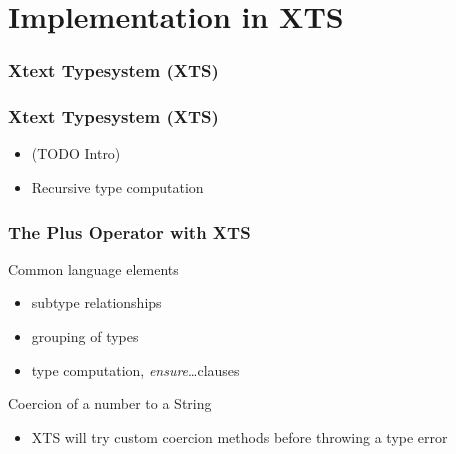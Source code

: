 \section[XTS]{Implementation in XTS}

\begin{frame}
  \frametitle{Xtext Typesystem (XTS)}
  \tableofcontents[currentsection]
\end{frame}

\begin{frame}
  \frametitle{Xtext Typesystem (XTS)}
  \begin{itemize}
  \item (TODO Intro)
  \item Recursive type computation
\end{itemize}
\end{frame}

\begin{frame}
\frametitle{The Plus Operator with XTS}

Common language elements
\begin{itemize}
  \item subtype relationships
  \item grouping of types
  \item type computation, \emph{ensure}\ldots clauses 
\end{itemize}

\begin{footnotesize}

\end{footnotesize}

\framebreak
Coercion of a number to a String
\begin{itemize}
  \item XTS will try custom coercion methods before throwing a type error 
\end{itemize}

\begin{footnotesize}

\end{footnotesize}

 	
 	
\end{frame}